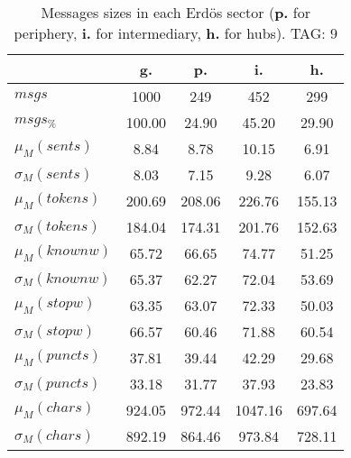 \begin{table}[h!]
\begin{center}
\begin{tabular}{| l | c | c | c | c |}\hline
 & g. & p. & i. & h. \\\hline
$msgs$ & 1000  & 249  & 452  & 299 \\\hline
$msgs_{\%}$ & 100.00  & 24.90  & 45.20  & 29.90 \\\hline
$\mu_M(sents)$ & 8.84  & 8.78  & 10.15  & 6.91 \\\hline
$\sigma_M(sents)$ & 8.03  & 7.15  & 9.28  & 6.07 \\\hline
$\mu_M(tokens)$ & 200.69  & 208.06  & 226.76  & 155.13 \\\hline
$\sigma_M(tokens)$ & 184.04  & 174.31  & 201.76  & 152.63 \\\hline
$\mu_M(knownw)$ & 65.72  & 66.65  & 74.77  & 51.25 \\\hline
$\sigma_M(knownw)$ & 65.37  & 62.27  & 72.04  & 53.69 \\\hline
$\mu_M(stopw)$ & 63.35  & 63.07  & 72.33  & 50.03 \\\hline
$\sigma_M(stopw)$ & 66.57  & 60.46  & 71.88  & 60.54 \\\hline
$\mu_M(puncts)$ & 37.81  & 39.44  & 42.29  & 29.68 \\\hline
$\sigma_M(puncts)$ & 33.18  & 31.77  & 37.93  & 23.83 \\\hline
$\mu_M(chars)$ & 924.05  & 972.44  & 1047.16  & 697.64 \\\hline
$\sigma_M(chars)$ & 892.19  & 864.46  & 973.84  & 728.11 \\\hline
\end{tabular}
\caption{Messages sizes in each Erd\"os sector ({{\bf p.}} for periphery, {{\bf i.}} for intermediary, {{\bf h.}} for hubs). TAG: 9}
\end{center}
\end{table}